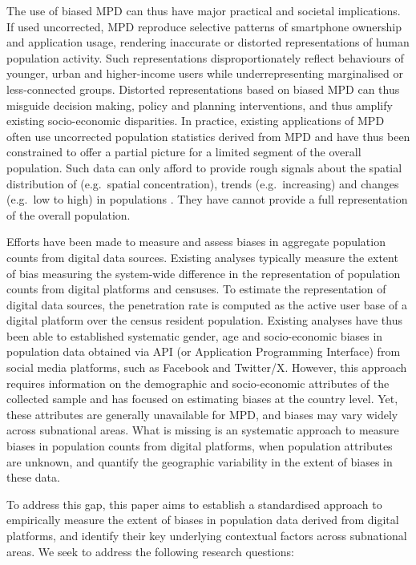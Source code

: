 \documentclass[]{rsos}%
\begin{document}
The use of biased MPD can thus have major practical and societal
implications. If used uncorrected, MPD reproduce selective patterns of
smartphone ownership and application usage, rendering inaccurate or
distorted representations of human population activity. Such
representations disproportionately reflect behaviours of younger, urban
and higher-income users while underrepresenting marginalised or
less-connected groups. Distorted representations based on biased MPD can
thus misguide decision making, policy and planning interventions, and
thus amplify existing socio-economic disparities. In practice, existing
applications of MPD often use uncorrected population statistics derived
from MPD and have thus been constrained to offer a partial picture for a
limited segment of the overall population. Such data can only afford to
provide rough signals about the spatial distribution of (e.g.~spatial
concentration), trends (e.g.~increasing) and changes (e.g.~low to high)
in populations \citep{rowe22-sensing-ukraine}. They have cannot provide a
full representation of the overall population.

Efforts have been made to measure and assess biases in aggregate
population counts from digital data sources. Existing analyses typically
measure the extent of bias measuring the system-wide difference in the
representation of population counts from digital platforms and censuses.
To estimate the representation of digital data sources, the penetration
rate is computed as the active user base of a digital platform over the
census resident population. Existing analyses have thus been able to
established systematic gender, age and socio-economic biases in
population data obtained via API (or Application Programming Interface)
from social media platforms, such as Facebook and Twitter/X. However,
this approach requires information on the demographic and socio-economic
attributes of the collected sample and has focused on estimating biases
at the country level. Yet, these attributes are generally unavailable
for MPD, and biases may vary widely across subnational areas. What is
missing is an systematic approach to measure biases in population counts
from digital platforms, when population attributes are unknown, and
quantify the geographic variability in the extent of biases in these
data.

To address this gap, this paper aims to establish a standardised
approach to empirically measure the extent of biases in population data
derived from digital platforms, and identify their key underlying
contextual factors across subnational areas. We seek to address the
following research questions:
\end{document}
